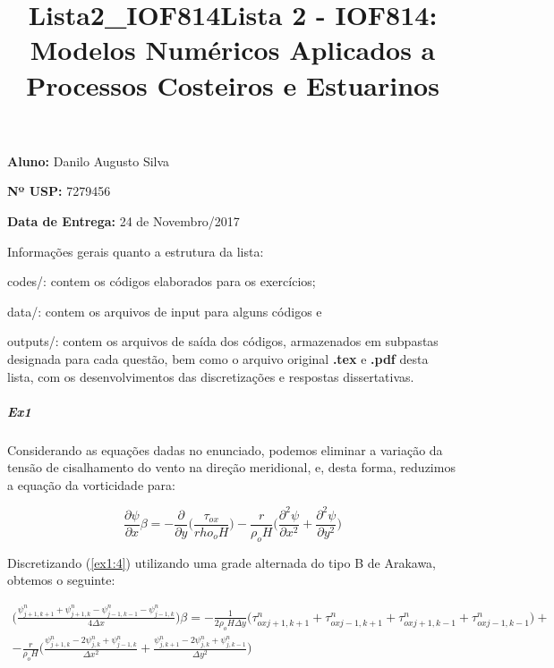 \documentclass[11pt]{article}
\title{Lista2\_IOF814}
\begin{document}
    \title{Lista 2 - IOF814: Modelos Numéricos Aplicados a Processos Costeiros e Estuarinos}
    \maketitle

    \begin{center}
    \textbf{Aluno:} Danilo Augusto Silva

    \textbf{Nº USP:} 7279456

    \textbf{Data de Entrega:} 24 de Novembro/2017
    \end{center}
    \vspace{0.5in}
    Informações gerais quanto a estrutura da lista:

    codes/: contem os códigos elaborados para os exercícios;

    data/: contem os arquivos de input para alguns códigos e

    outputs/: contem os arquivos de saída dos códigos, armazenados em
    subpastas designada para cada questão, bem como o arquivo original \textbf{.tex}
    e \textbf{.pdf} desta lista, com os desenvolvimentos das discretizações e
    respostas dissertativas.

\dotfill

    \subparagraph{Ex1}

    Considerando as equações dadas no enunciado, podemos eliminar a variação
da tensão de cisalhamento do vento na direção meridional, e, desta
forma, reduzimos a equação da vorticidade para:

\begin{equation}
    \frac{\partial{\psi}}{\partial{x}}\beta = - \frac{\partial}{\partial{y}}\bigg( \frac{\tau_ {ox}}{rho_oH} \bigg)- \frac{r}{\rho_oH}\bigg( \frac{\partial^2{\psi}}{\partial{x^2}} + \frac{\partial^2{\psi}}{\partial{y^2}} \bigg)
    \label{ex1:4}
\end{equation}

\bigskip
Discretizando (\ref{ex1:4}) utilizando uma grade alternada do tipo B de Arakawa,
obtemos o seguinte:

\begin{equation}
\begin{aligned}
\bigg( \frac{\psi^{n}_{j+1,k+1} + \psi^{n}_{j+1,k} - \psi^{n}_{j-1,k-1} - \psi^{n}_{j-1,k}}{4\Delta{x}} \bigg)\beta = -\frac{1}{2\rho_oH\Delta{y}}\bigg( \tau^{n}_{ox j+1,k+1} + \tau^{n}_{ox j-1,k+1} + \tau^{n}_{ox j+1,k-1} + \tau^{n}_{ox j-1,k-1}\bigg) + \\
- \frac{r}{\rho_oH}\bigg(
  \frac{\psi^{n}_{j+1,k} - 2\psi^{n}_{j,k} + \psi^{n}_{j-1,k}}{\Delta{x^2}}
+ \frac{\psi^{n}_{j,k+1} - 2\psi^{n}_{j,k} + \psi^{n}_{j,k-1}}{\Delta{y^2}} \bigg)
\label{ex1:5}
\end{aligned}
\end{equation}
\end{document}
